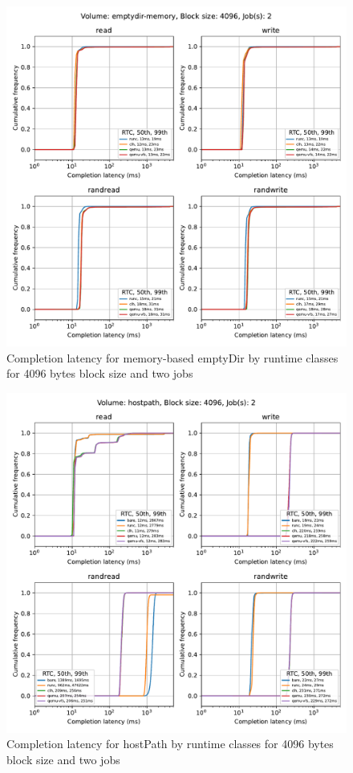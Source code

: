 \begin{figure}[ht]
  \begin{center}
    \includegraphics[width=12cm]{results/subplot_clat_bw_by_rw(emptydir-memory,2,4096).pdf}
    \caption{Completion latency for memory-based emptyDir by runtime classes for 4096 bytes block size and two jobs}
    \label{fig:ResultsEDMEMClatByRTC4096-2}
  \end{center}
\end{figure}

\begin{figure}[ht]
  \begin{center}    
    \includegraphics[width=12cm]{results/subplot_clat_bw_by_rw(hostpath,2,4096).pdf}
    \caption{Completion latency for hostPath by runtime classes for 4096 bytes block size and two jobs}
    \label{fig:ResultsHPClatByRTC4096-2}
  \end{center}
\end{figure}

